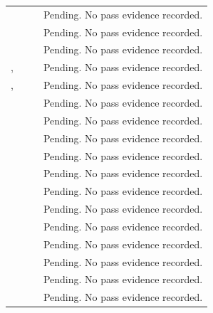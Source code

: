 \begin{tabularx}{\linewidth}{L{2.9cm}L{2.45cm}L{2.45cm}Y}
 &  &  & Pending. No pass evidence recorded.\\
 &  &  & Pending. No pass evidence recorded.\\
 &  &  & Pending. No pass evidence recorded.\\
,  &  &  & Pending. No pass evidence recorded.\\
,  &  &  & Pending. No pass evidence recorded.\\
 &  &  & Pending. No pass evidence recorded.\\
 &  &  & Pending. No pass evidence recorded.\\
 &  &  & Pending. No pass evidence recorded.\\
 &  &  & Pending. No pass evidence recorded.\\
 &  &  & Pending. No pass evidence recorded.\\
 &  &  & Pending. No pass evidence recorded.\\
 &  &  & Pending. No pass evidence recorded.\\
 &  &  & Pending. No pass evidence recorded.\\
 &  &  & Pending. No pass evidence recorded.\\
 &  &  & Pending. No pass evidence recorded.\\
 &  &  & Pending. No pass evidence recorded.\\
 &  &  & Pending. No pass evidence recorded.\\

\end{tabularx}
